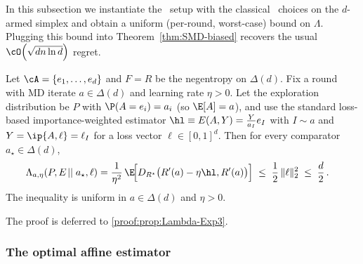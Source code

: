 In this subsection we instantiate the \expbyopt\ setup with the classical
\expthree\ choices on the $d$-armed simplex and obtain a uniform
(per-round, worst-case) bound on $\Lambda$. Plugging this bound into
Theorem~\ref{thm:SMD-biased} recovers the usual
$\cO\!\left(\sqrt{dn\ln d}\right)$ regret.
\begin{proposition}\label{prop:Lambda-Exp3}
    Let $\cA=\{e_1,\ldots,e_d\}$ and $F=R$ be the negentropy on $\Delta(d)$.
    Fix a round with MD iterate $a\in\Delta(d)$ and learning rate $\eta>0$.
    Let the exploration distribution be $P$ with
    $\P(A=e_i)=a_i$ (so $\E[A]=a$), and use the standard loss-based
    importance-weighted estimator
    \(
    \hl \equiv E(A,Y)=\frac{Y}{a_I}e_I
    \)
    with $I\sim a$ and $Y=\ip{A,\ell}=\ell_I$ for a loss vector $\ell\in[0,1]^d$.
    Then for every comparator $a_\star\in\Delta(d)$,
    \begin{align}
        \Lambda_{a,\eta}(P,E\!\mid\mid a_\star,\ell)
         & =
        \frac{1}{\eta^2}\,
        \E\!\Big[D_{R^\star}\big(R'(a)-\eta \hl,R'(a)\big)\Big]
        \;\le\;
        \frac{1}{2}\,\|\ell\|_2^2
        \;\le\;
        \frac{d}{2}\,.
        \label{eq:Lambda-Exp3-bound}
    \end{align}
    The inequality is uniform in $a\in\Delta(d)$ and $\eta>0$.
\end{proposition}
The proof is deferred to \ref{proof:prop:Lambda-Exp3}.
\subsubsection{The optimal affine estimator}